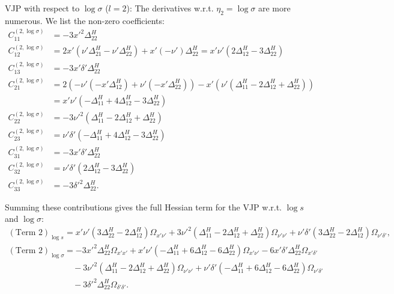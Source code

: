 \documentclass{article}
\begin{document}
VJP with respect to $\log \sigma$ ($l=2$):
The derivatives w.r.t. $\eta_2 = \log \sigma$ are more numerous.
We list the non-zero coefficients:
%
\begin{align}
  C^{(2,\log\sigma)}_{11} & = -3x'^2\Delta^H_{22}                                                                                       \\
  C^{(2,\log\sigma)}_{12} & = 2x'(\nu'\Delta^H_{21}-\nu'\Delta^H_{22}) + x'(-\nu')\Delta^H_{22} = x'\nu'(2\Delta^H_{12}-3\Delta^H_{22}) \\
  C^{(2,\log\sigma)}_{13} & = -3x'\delta'\Delta^H_{22}                                                                                  \\
  C^{(2,\log\sigma)}_{21} & = 2(-\nu'(-x'\Delta^H_{12}) + \nu'(-x'\Delta^H_{22})) -x'(\nu'(\Delta^H_{11}-2\Delta^H_{12}+\Delta^H_{22})) \\
                          & = x'\nu'(-\Delta^H_{11} + 4\Delta^H_{12} - 3\Delta^H_{22})                                                  \\
  C^{(2,\log\sigma)}_{22} & = -3\nu'^2(\Delta^H_{11}-2\Delta^H_{12}+\Delta^H_{22})                                                      \\
  C^{(2,\log\sigma)}_{23} & = \nu'\delta'(-\Delta^H_{11} + 4\Delta^H_{12} - 3\Delta^H_{22})                                             \\
  C^{(2,\log\sigma)}_{31} & = -3x'\delta'\Delta^H_{22}                                                                                  \\
  C^{(2,\log\sigma)}_{32} & = \nu'\delta'(2\Delta^H_{12}-3\Delta^H_{22})                                                                \\
  C^{(2,\log\sigma)}_{33} & = -3\delta'^2\Delta^H_{22}.
\end{align}

Summing these contributions gives the full Hessian term for the VJP w.r.t. $\log s$ and $\log \sigma$:
%
\begin{align}
  (\text{Term 2})_{\log s}     & = x'\nu'(3\Delta^H_{22} - 2\Delta^H_{12}) \Omega_{x'\nu'} + 3\nu'^2(\Delta^H_{11}-2\Delta^H_{12}+\Delta^H_{22})\Omega_{\nu'\nu'} + \nu'\delta'(3\Delta^H_{22} - 2\Delta^H_{12})\Omega_{\nu'\delta'}, \\
  (\text{Term 2})_{\log\sigma} & = - 3x'^2\Delta^H_{22} \Omega_{x'x'} + x'\nu'(-\Delta^H_{11} + 6\Delta^H_{12} - 6\Delta^H_{22}) \Omega_{x'\nu'} - 6 x'\delta'\Delta^H_{22} \Omega_{x'\delta'} \nonumber                              \\ & \quad - 3\nu'^2(\Delta^H_{11} - 2\Delta^H_{12} + \Delta^H_{22}) \Omega_{\nu'\nu'} + \nu'\delta'(-\Delta^H_{11} + 6\Delta^H_{12} - 6\Delta^H_{22}) \Omega_{\nu'\delta'} \nonumber \\ & \quad - 3\delta'^2\Delta^H_{22} \Omega_{\delta'\delta'}.
\end{align}
\end{document}
